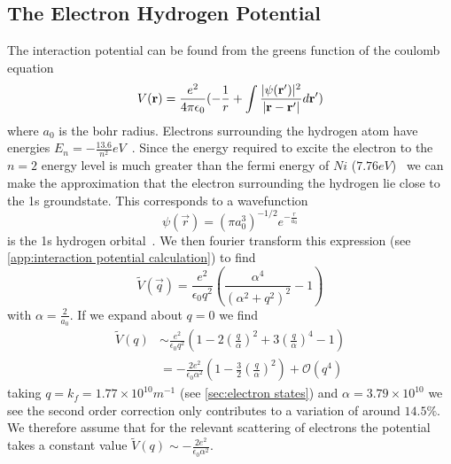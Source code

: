 \subsection{The Electron Hydrogen Potential}\label{sec:electron hydrogen potential}




The interaction potential can be found from
the greens function of the coulomb
equation~\cite{AQP_Problems}
\begin{equation}
    V(\mathbf{r}) = \frac{e^2}{4 \pi \epsilon_0}(
    -\frac{1}{r}
    + \int{\frac{\lvert\psi(\mathbf{r}')\rvert^2}{
            \lvert\mathbf{r} - \mathbf{r'}\rvert} d\mathbf{r}'})
\end{equation}
where \(a_0\) is
the bohr radius.
Electrons surrounding the hydrogen
atom have energies
\(E_n = -\frac{13.6}{n^2} eV\)~\cite{griffiths_schroeter_2018}.
Since the energy required to excite the electron
to the \(n=2\) energy level is much greater
than the fermi energy of \(Ni\)
(\(7.76eV\))~\cite{PhysRev.131.2469} we can
make the approximation that the electron surrounding
the hydrogen lie close to the 1s groundstate. This
corresponds to a wavefunction
\begin{equation}
    \psi(\vec{r}) = {(\pi a_0^3)}^{-1/2} e^{-\frac{r}{a_0}}
\end{equation}
is the 1s hydrogen orbital~\cite{griffiths_schroeter_2018}.
We then fourier
transform this expression
(see \cref{app:interaction potential calculation})
to find
\begin{equation}
    \tilde{V}(\vec{q}) = \frac{e^2}{\epsilon_0 q^2}(
    \frac{\alpha^4}{{(\alpha^2 + q^2)}^2} - 1
    )
\end{equation}
with \(\alpha = \frac{2}{a_0}\). If we expand
about \(q=0\) we find
\begin{align}
    \tilde{V}(q) & \sim \frac{e^2}{\epsilon_0 q^2}(1 - 2{(\frac{q}{\alpha})}^2 + 3 {(\frac{q}{\alpha})}^4 - 1)   \\
    {}           & = -\frac{2e^2}{\epsilon_0 \alpha^2}(1 - \frac{3}{2}{(\frac{q}{\alpha})}^2) + \mathcal{O}(q^4)
\end{align}
taking \(q = k_f = 1.77\times{}10^{10}m^{-1}\)
(see \cref{sec:electron states})
and \(\alpha = 3.79\times{}10^{10}\) we see the second
order correction only contributes to a variation
of around \(14.5\% \).
We therefore assume that for the relevant scattering
of electrons the potential takes a constant
value \(\tilde{V}(q) \sim -\frac{2e^2}{\epsilon_0 \alpha^2}\).

